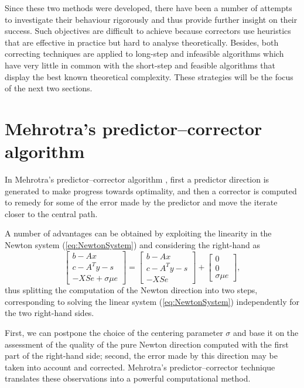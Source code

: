 Since these two methods were developed, there have been a number of 
attempts to investigate their behaviour rigorously and thus provide
further insight on their success. 
Such objectives are difficult to achieve because 
correctors use heuristics that are effective in practice but hard 
to analyse theoretically. 
Besides, both correcting techniques are applied to long-step and infeasible 
algorithms which have very little in common with the short-step and 
feasible algorithms that display the best known theoretical complexity.
These strategies will be the focus of the next two sections.


%
%
\section{Mehrotra's predictor--corrector algorithm}
\label{sec:MehrotraPC}

In Mehrotra's predictor--corrector algorithm \cite{Mehrotra92}, 
first a predictor direction is generated 
to make progress towards optimality, and then 
a corrector is computed to remedy for some of the error made by the predictor
and move the iterate closer to the central path.

A number of advantages can be obtained by exploiting the
linearity in the Newton system (\ref{eq:NewtonSystem}) and
considering the right-hand as
\[
 \left[ 
  \begin{array}{c}
    b-Ax \\ c-A^Ty-s \\ -XSe + \sigma\mu e
  \end{array} \right]
 = \left[ 
  \begin{array}{c}
    b-Ax \\ c-A^Ty-s \\ -XSe
  \end{array} \right]
 + \left[ 
  \begin{array}{c}
    0 \\ 0 \\ \sigma\mu e
  \end{array} \right],
\]
thus splitting the computation 
of the Newton direction into two steps, corresponding to solving the linear
system (\ref{eq:NewtonSystem}) independently for the two right-hand 
sides. 

First, we can postpone the choice of the centering parameter 
$\sigma$ and base it on the assessment of the quality of the 
pure Newton direction computed with the first part of the right-hand side;
second, the error made by this direction may be 
taken into account and
corrected. Mehrotra's predictor--corrector technique \cite{Mehrotra92}
translates these observations into a powerful computational method.


